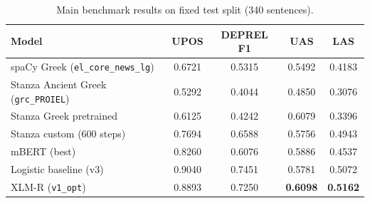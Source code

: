 \begin{table}[H]

\centering

\caption{Main benchmark results on fixed test split (340 sentences).}

\label{tab:main_benchmark}

\begin{tabular}{lcccc}

\toprule

Model & UPOS & DEPREL F1 & UAS & LAS \\

\midrule

spaCy Greek (\texttt{el\_core\_news\_lg}) & 0.6721 & 0.5315 & 0.5492 & 0.4183 \\

Stanza Ancient Greek (\texttt{grc\_PROIEL}) & 0.5292 & 0.4044 & 0.4850 & 0.3076 \\

Stanza Greek pretrained & 0.6125 & 0.4242 & 0.6079 & 0.3396 \\

Stanza custom (600 steps) & 0.7694 & 0.6588 & 0.5756 & 0.4943 \\

mBERT (best) & 0.8260 & 0.6076 & 0.5886 & 0.4537 \\

Logistic baseline (v3) & 0.9040 & 0.7451 & 0.5781 & 0.5072 \\

XLM-R (\texttt{v1\_opt}) & 0.8893 & 0.7250 & \textbf{0.6098} & \textbf{0.5162} \\

\bottomrule

\end{tabular}

\end{table}

